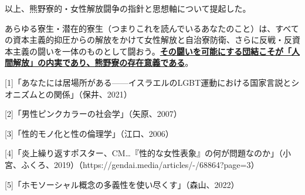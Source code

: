 \vspace{10mm}
\par 以上、熊野寮的・女性解放闘争の指針と思想軸について提起した。\par あらゆる寮生・潜在的寮生（つまりこれを読んでいるあなたのこと）は、すべての資本主義的抑圧からの解放をかけて女性解放と自治寮防衛、さらに反戦・反資本主義の闘いを一体のものとして闘おう。\uline{\bf{その闘いを可能にする団結こそが「人間解放」の内実であり、熊野寮の存在意義である}}。


\vspace{10mm}
\begin{description}
\item{[1]}「あなたには居場所がある——イスラエルのLGBT運動における国家言説とシオニズムとの関係」（保井、2021）
\item{[2]}「男性ピンクカラーの社会学」（矢原、2007）
\item{[3]}「性的モノ化と性の倫理学」（江口、2006）
\item{[4]}「炎上繰り返すポスター、CM…『性的な女性表象』の何が問題なのか」（小宮、ふくろ、2019）\newline （https://gendai.media/articles/-/68864?page=3）
\item{[5]}「ホモソーシャル概念の多義性を使い尽くす」（森山、2022）
\end{description}